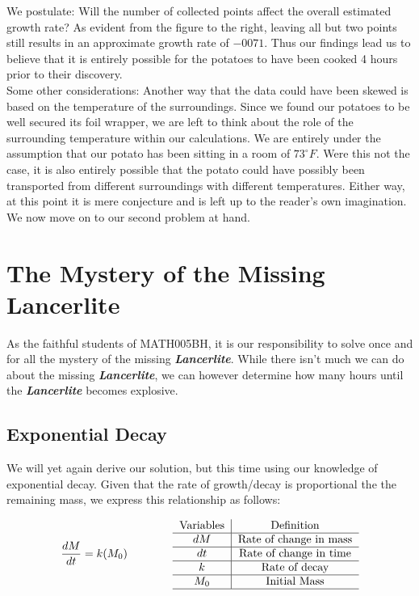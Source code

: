\documentclass{article}
\begin{document}
We postulate: Will the number of collected points affect the overall estimated growth rate? As evident from the figure to the right, leaving all but two points still results in an approximate growth rate of $-0071$. Thus our findings lead us to believe that it is entirely possible for the potatoes to have been cooked 4 hours prior to their discovery. \\

Some other considerations: Another way that the data could have been skewed is based on the
temperature of the surroundings. Since we found our potatoes to be well secured its foil
wrapper, we are left to think about the role of the surrounding temperature within our
calculations. We are entirely under the assumption that our potato has been sitting in a room
of $73^{\circ}F$. Were this not the case, it is also entirely possible that the potato could
have possibly been transported from different surroundings with different temperatures. Either
way, at this point it is mere conjecture and is left up to the reader's own imagination. We now
move on to our second problem at hand.

\newpage
\section{The Mystery of the Missing Lancerlite}
As the faithful students of MATH005BH, it is our responsibility to solve once and for all the mystery of the missing \textbf{\textit{Lancerlite}}. While there isn't much we can do about the missing \textbf{\textit{Lancerlite}}, we can however determine how many hours until the \textbf{\textit{Lancerlite}} becomes explosive. 

\subsection{Exponential Decay}
We will yet again derive our solution, but this time using our knowledge of exponential decay. Given that the rate of growth/decay is proportional the the remaining mass, we express this relationship as follows:


\begin{align*}
    \frac{dM}{dt}=k(M_0) \qquad\qquad
    \begin{tabular}{c|c}
     Variables & Definition  \\ \hline
     $dM$ & \text{Rate of change in mass} \\\hline 
     $dt$ & \text{Rate of change in time} \\\hline
     $k$ & \text{Rate of decay} \\\hline
     $M_0$ & \text{Initial Mass}\\\hline
\end{tabular}
\end{align*}
\end{document}
